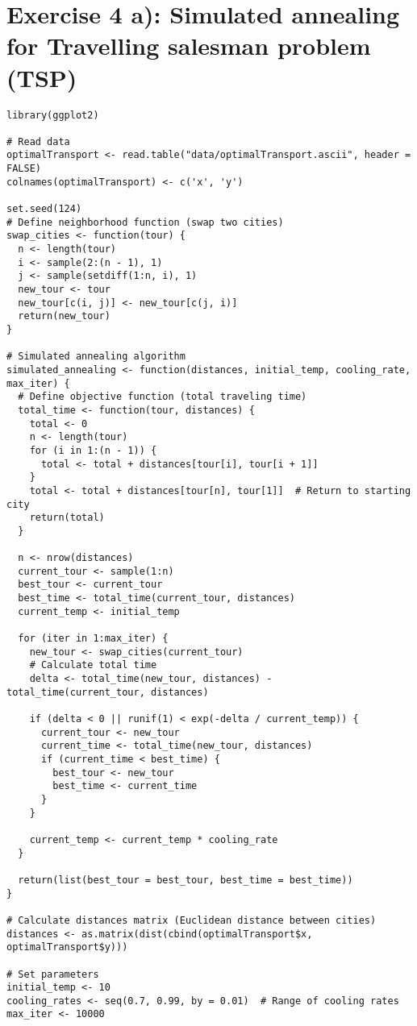 \section*{Exercise 4 a): Simulated annealing for Travelling salesman problem (TSP)}
\begin{tcolorbox}[colback=white!95!black,colframe=white!50!black,breakable]
\begin{lstlisting}[caption={Exercise 4a}, label={lst:simul_anneal}]
library(ggplot2)

# Read data
optimalTransport <- read.table("data/optimalTransport.ascii", header = FALSE)
colnames(optimalTransport) <- c('x', 'y')

set.seed(124)
# Define neighborhood function (swap two cities)
swap_cities <- function(tour) {
  n <- length(tour)
  i <- sample(2:(n - 1), 1)
  j <- sample(setdiff(1:n, i), 1)
  new_tour <- tour
  new_tour[c(i, j)] <- new_tour[c(j, i)]
  return(new_tour)
}

# Simulated annealing algorithm
simulated_annealing <- function(distances, initial_temp, cooling_rate, max_iter) {
  # Define objective function (total traveling time)
  total_time <- function(tour, distances) {
    total <- 0
    n <- length(tour)
    for (i in 1:(n - 1)) {
      total <- total + distances[tour[i], tour[i + 1]]
    }
    total <- total + distances[tour[n], tour[1]]  # Return to starting city
    return(total)
  }
  
  n <- nrow(distances)
  current_tour <- sample(1:n)
  best_tour <- current_tour
  best_time <- total_time(current_tour, distances)
  current_temp <- initial_temp
  
  for (iter in 1:max_iter) {
    new_tour <- swap_cities(current_tour)
    # Calculate total time
    delta <- total_time(new_tour, distances) - total_time(current_tour, distances)
    
    if (delta < 0 || runif(1) < exp(-delta / current_temp)) {
      current_tour <- new_tour
      current_time <- total_time(new_tour, distances)
      if (current_time < best_time) {
        best_tour <- new_tour
        best_time <- current_time
      }
    }
    
    current_temp <- current_temp * cooling_rate
  }
  
  return(list(best_tour = best_tour, best_time = best_time))
}

# Calculate distances matrix (Euclidean distance between cities)
distances <- as.matrix(dist(cbind(optimalTransport$x, optimalTransport$y)))

# Set parameters
initial_temp <- 10
cooling_rates <- seq(0.7, 0.99, by = 0.01)  # Range of cooling rates
max_iter <- 10000


\end{lstlisting}
\end{tcolorbox}
